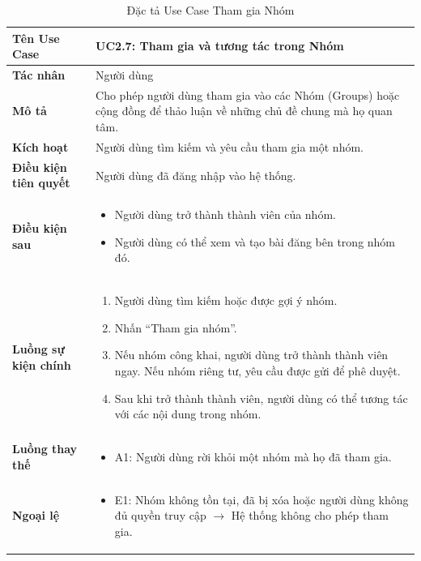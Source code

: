 \begin{table}[H]
\centering
\begin{tabularx}{\textwidth}{|l|X|}
\hline
\textbf{Tên Use Case} & \textbf{UC2.7: Tham gia và tương tác trong Nhóm} \\ \hline
\textbf{Tác nhân} & Người dùng \\ \hline
\textbf{Mô tả} & Cho phép người dùng tham gia vào các Nhóm (Groups) hoặc cộng đồng để thảo luận về những chủ đề chung mà họ quan tâm. \\ \hline
\textbf{Kích hoạt} & Người dùng tìm kiếm và yêu cầu tham gia một nhóm. \\ \hline
\textbf{Điều kiện tiên quyết} & Người dùng đã đăng nhập vào hệ thống. \\ \hline
\textbf{Điều kiện sau} & 
\begin{itemize}
    \item Người dùng trở thành thành viên của nhóm.
    \item Người dùng có thể xem và tạo bài đăng bên trong nhóm đó.
\end{itemize} \\ \hline
\textbf{Luồng sự kiện chính} & 
\begin{enumerate}
    \item Người dùng tìm kiếm hoặc được gợi ý nhóm.
    \item Nhấn ``Tham gia nhóm''.
    \item Nếu nhóm công khai, người dùng trở thành thành viên ngay. Nếu nhóm riêng tư, yêu cầu được gửi để phê duyệt.
    \item Sau khi trở thành thành viên, người dùng có thể tương tác với các nội dung trong nhóm.
\end{enumerate} \\ \hline
\textbf{Luồng thay thế} & 
\begin{itemize}
    \item A1: Người dùng rời khỏi một nhóm mà họ đã tham gia.
\end{itemize} \\ \hline
\textbf{Ngoại lệ} & 
\begin{itemize}
    \item E1: Nhóm không tồn tại, đã bị xóa hoặc người dùng không đủ quyền truy cập $\rightarrow$ Hệ thống không cho phép tham gia.
\end{itemize} \\ \hline
\end{tabularx}
\caption{Đặc tả Use Case Tham gia Nhóm}
\end{table}

